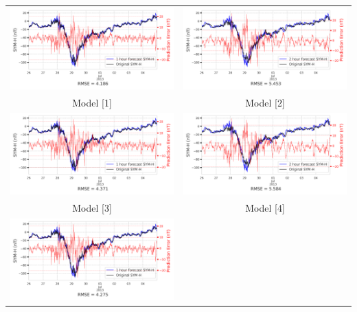 \documentclass[draft,sw]{agutexSI2019}
\begin{document}
\begin{table}
\centering
\begin{tabular}{cc}
\includegraphics[width=0.49\linewidth]{paper_plots/1h_swics/1h_swics_storm_40.png}
&
\includegraphics[width=0.49\linewidth]{paper_plots/2h_swics/2h_swics_storm_40.png}
\\
Model [1] & Model [2]
\vspace*{12pt}
\\
\includegraphics[width=0.49\linewidth]{paper_plots/1h_no_swics/1h_no_swics_storm_40.png}
&
\includegraphics[width=0.49\linewidth]{paper_plots/2h_no_swics/2h_no_swics_storm_40.png}
\\
Model [3] & Model [4]
\vspace*{12pt}
\\
\includegraphics[width=0.49\linewidth]{paper_plots/1h_swics_model_on_no_swics/1h_swics_model_on_no_swics_storm_40.png}

\end{tabular}
\end{table}
\end{document}
